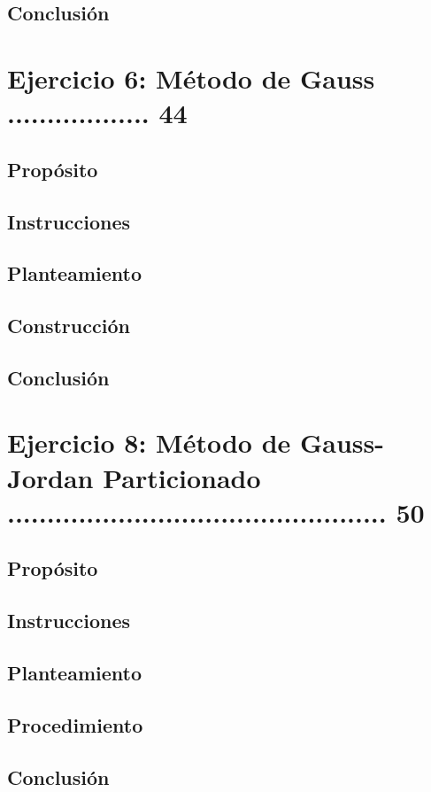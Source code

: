 \documentclass{article}
\begin{document}
\subsection{Conclusión}

\section{Ejercicio 6: Método de Gauss .................. 44}
\subsection{Propósito}
\subsection{Instrucciones}
\subsection{Planteamiento}
\subsection{Construcción}
\subsection{Conclusión}

\pagebreak

\section{Ejercicio 8: Método de Gauss-Jordan Particionado ................................................ 50}
\subsection{Propósito}
\subsection{Instrucciones}
\subsection{Planteamiento}
\subsection{Procedimiento}
\subsection{Conclusión}
\end{document}

